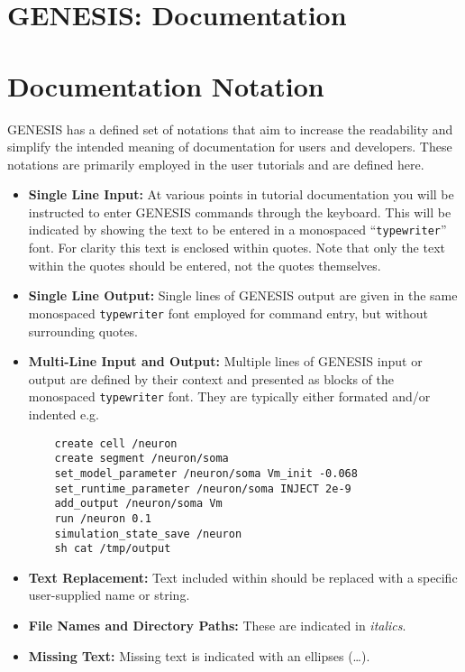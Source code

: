 \documentclass[12pt]{article}
\begin{document}
\section*{GENESIS: Documentation}

\section*{Documentation Notation}

GENESIS has a defined set of notations that aim to increase the readability and simplify the intended meaning of documentation for users and developers. These notations are primarily employed in the user tutorials and are defined here.

\begin{itemize}

\item {\bf Single Line Input:} At various points in tutorial documentation you will be instructed to enter GENESIS commands through the keyboard. This will be indicated by showing the text to be entered in a monospaced ``{\tt typewriter}'' font. For clarity this text is enclosed within quotes. Note that only the text within the quotes should be entered, not the quotes themselves.

\item {\bf Single Line Output:} Single lines of GENESIS output are given in the same monospaced {\tt typewriter} font employed for command entry, but without surrounding quotes.

\item {\bf Multi-Line Input and Output:} Multiple lines of GENESIS input or output are defined by their context and presented as blocks of the monospaced {\tt typewriter} font. They are typically either formated and/or indented e.g.

\begin{verbatim}
    create cell /neuron
    create segment /neuron/soma
    set_model_parameter /neuron/soma Vm_init -0.068
    set_runtime_parameter /neuron/soma INJECT 2e-9
    add_output /neuron/soma Vm
    run /neuron 0.1
    simulation_state_save /neuron
    sh cat /tmp/output
\end{verbatim}

\item {\bf Text Replacement:} Text included within {\tt <angle brackets>} should be replaced with a specific user-supplied name or string.

\item {\bf File Names and Directory Paths:} These are indicated in {\it italics}.

\item {\bf Missing Text:} Missing text is indicated with an ellipses (\ldots).

\end{itemize}
\end{document}
